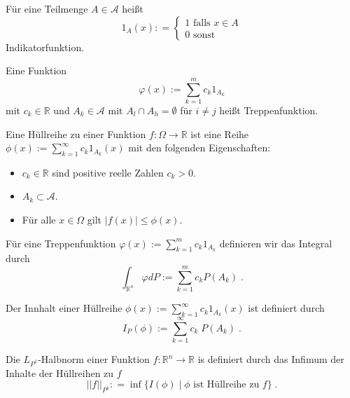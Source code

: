\begin{Definition}
Für eine Teilmenge $A \in \mathcal{A}$ heißt
$$ 1_A (x): = \begin{cases} 1 \text{  falls }   x \in A  \\  0  \text{  sonst}  \end{cases}$$
Indikatorfunktion.
\end{Definition}

\begin{Definition}
Eine Funktion 
$$ \varphi(x) := \sum_{k=1}^m c_k 1_{A_k}$$ mit $c_k \in \mathbb{R}$ und $A_k \in \mathcal{A}$ mit $A_l \cap A_h = \emptyset$ für $i \neq j$
heißt Treppenfunktion.
\end{Definition}





\begin{Definition}
Eine Hüllreihe zu einer Funktion $f :\Omega \to \mathbb{R}$ ist eine Reihe $\phi(x):= \sum_{k=1}^{\infty} c_k  1_{A_k} (x)$ mit den folgenden Eigenschaften:
\begin{itemize}
\item $c_k \in \mathbb{R}$ sind positive reelle Zahlen $c_k >0$.
\item $A_k \subset \mathcal{A}$.
\item Für alle $x \in \Omega$ gilt $|f(x) | \leq \phi(x)$.
\end{itemize}
\end{Definition}

 
\begin{Definition}
Für eine Treppenfunktion $ \varphi(x) := \sum_{k=1}^m c_k 1_{A_k}$ definieren wir das Integral durch
$$\int_{\mathbb{R}^n} \varphi dP := \sum_{k =1}^m  c_k P(A_k) \; . $$
\end{Definition}


\begin{Definition}
Der Innhalt einer Hüllreihe $\phi(x):= \sum_{k=1}^{\infty} c_k  1_{A_k} (x)$ ist definiert durch 
$$I_P (\phi) := \sum_{k=1}^{\infty} c_k \;  P(A_k) \; .$$
\end{Definition}


\begin{Definition}
Die $L_{P^1}$-Halbnorm einer Funktion $f :\mathbb{R}^n \to \mathbb{R}$ is definiert durch das Infimum der Inhalte der Hüllreihen zu $f$
$$ || f ||_{P^1} : = \inf  \biggl \{   I(\phi) \; | \; \phi  \text{ ist Hüllreihe zu  }  f \biggr \} \; .$$
\end{Definition}



